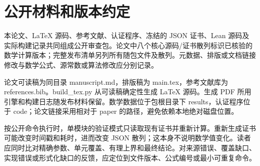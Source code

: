 \documentclass[UTF8,zihao=-4,fontset=fandol]{ctexart}
\begin{document}
\section{公开材料和版本约定}

本论文、LaTeX 源码、参考文献、认证程序、冻结的 JSON 证书、Lean 源码及实际构建记录共同组成公开审查包。论文中八个核心源码/证书散列标识已核验的数学计算版本；完整发布清单另列所有随包文件及散列。元数据、排版或文档链接修改与数学公式、源常数或算法修改应分别记录。

论文可读稿为同目录 manuscript.md，排版稿为 main.tex，参考文献库为 references.bib。build\_tex.py 从可读稿确定性生成 LaTeX 源码。生成 PDF 所用引擎和构建日志随发布材料保留。数学数据位于包根目录下 results，认证程序位于 code；论文链接采用相对于 paper 的路径，避免依赖本地绝对磁盘位置。

按公开命令执行时，单模块的验证模式只读取现有证书并重新计算。重新生成证书可能改变时间戳和耗时，进而改变 JSON 散列；这本身不说明数学值变化。读者应同时比对精确参数、单元覆盖、有理上界和最终结论。对来源错误、覆盖缺口、实现错误或形式化缺口的反馈，应定位到文件版本、公式编号或最小可重复命令。
\end{document}
